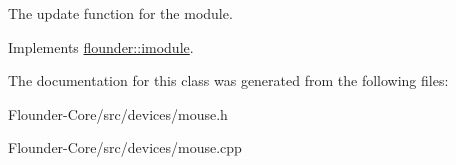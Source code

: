 The update function for the module. 



Implements \hyperlink{classflounder_1_1imodule_a9a53d48a46b5f6b16a92b2cd8503f74a}{flounder\+::imodule}.



The documentation for this class was generated from the following files\+:\begin{DoxyCompactItemize}
\item 
Flounder-\/\+Core/src/devices/mouse.\+h\item 
Flounder-\/\+Core/src/devices/mouse.\+cpp\end{DoxyCompactItemize}
